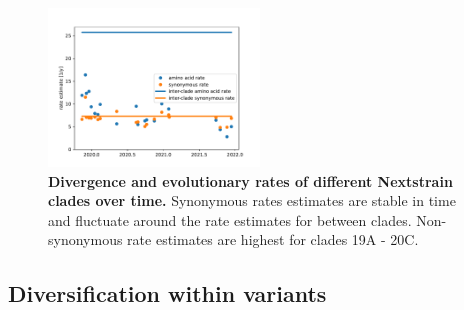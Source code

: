 \documentclass[aps,rmp, twocolumn]{revtex4}
\begin{document}
\begin{figure}
    \includegraphics[width=0.5\textwidth]{figures/rate_progression.pdf}
    \caption[]{{\bf Divergence and evolutionary rates of different Nextstrain clades over time.} Synonymous rates estimates are stable in time and fluctuate around the rate estimates for between clades. Non-synonymous rate estimates are highest for clades 19A - 20C.
    \label{fig:rate_progression} }
\end{figure}

\subsection*{Diversification within variants}


\end{document}
